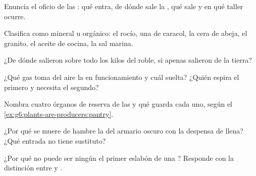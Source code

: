 \begin{exercise}[$\star$]\label{exo:g6:plants-are-producers:2}
Enuncia el oficio de las : qué entra, de dónde sale la
, qué sale y en qué taller ocurre.
\end{exercise}

\begin{exercise}[$\star$]\label{exo:g6:plants-are-producers:3}
Clasifica como mineral u orgánico: el rocío, una  de caracol, la
cera de abeja, el granito, el aceite de cocina, la sal marina.
\end{exercise}

\begin{exercise}[$\star$]\label{exo:g6:plants-are-producers:4}
¿De dónde salieron sobre todo los kilos del roble, si apenas salieron
de la tierra?
\end{exercise}

\begin{exercise}[$\star$]\label{exo:g6:plants-are-producers:5}
¿Qué gas toma del aire la  en funcionamiento y cuál suelta? ¿Quién
espira el primero y necesita el segundo?
\end{exercise}

\begin{exercise}[$\star$]\label{exo:g6:plants-are-producers:6}
Nombra cuatro órganos de reserva de las  y qué guarda cada uno,
según el \cref{ex:g6:plants-are-producers:pantry}.
\end{exercise}

\begin{exercise}[$\star\star$]\label{exo:g6:plants-are-producers:7}
¿Por qué se muere de hambre la  del armario oscuro con la
despensa de  llena? ¿Qué entrada no tiene sustituto?
\end{exercise}

\begin{exercise}[$\star\star$]\label{exo:g6:plants-are-producers:8}
¿Por qué no puede ser ningún  el primer eslabón de una ? Responde con la distinción entre  y .
\end{exercise}

